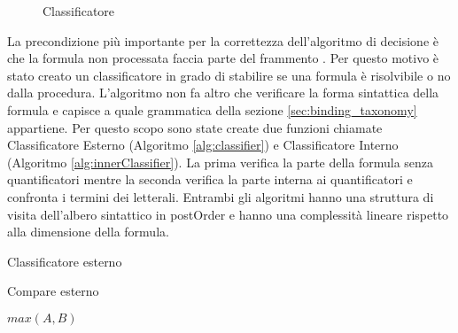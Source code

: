 \documentclass[./main.tex]{subfiles}
\begin{document}
\begin{figure}[H]
    \centering
    \scalebox{0.55}{
        
    }
    \caption{Classificatore}
    \label{fig:classifier}
\end{figure}

La precondizione più importante per la correttezza dell'algoritmo di decisione è che la formula non processata faccia parte del frammento \cb.
Per questo motivo è stato creato un classificatore in grado di stabilire se una formula è risolvibile o no dalla procedura.
L'algoritmo non fa altro che verificare la forma sintattica della formula e capisce a quale grammatica della sezione \ref{sec:binding_taxonomy}
appartiene. Per questo scopo sono state create due funzioni chiamate Classificatore Esterno (Algoritmo \ref{alg:classifier}) e Classificatore Interno (Algoritmo \ref{alg:innerClassifier}).
La prima verifica la parte della formula senza quantificatori mentre la seconda verifica la parte interna ai quantificatori e confronta 
i termini dei letterali. 
Entrambi gli algoritmi hanno una struttura di visita dell'albero sintattico in postOrder e hanno una complessità lineare rispetto alla dimensione della formula.


\begin{algorithm}[H] \label{alg:classifier}
\caption{Classificatore esterno}

\end{algorithm}
\begin{algorithm}[H] \label{alg:compare}
    \caption{Compare esterno}
\Return $max(A, B)$\;

\end{algorithm}
\end{document}
